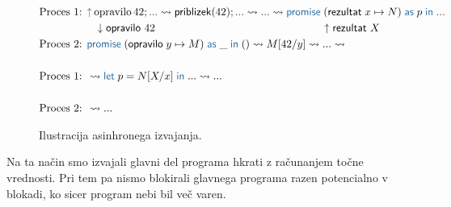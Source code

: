 \begin{figure}[H]
	\centering
	\small
	\begin{align*}
		& \text{Proces 1: }  \tmkw{\uparrow}\, \text{opravilo}\,42;... \reduces \mathsf{priblizek}(42);...  \reduces ... \reduces \tmwith{rezultat}{x}{N}{p}{...}
		\\
		&                \hspace{12ex} \downarrow \mathsf{opravilo}\ 42      \hspace{36ex}              \uparrow \mathsf{rezultat}\ X
		\\
		& \text{Proces 2: } \tmwith{opravilo}{y}{M}{\_}{()} \reduces M[42/y] \reduces ... \reduces
		\\
		\\
		& \text{Proces 1: }  \reduces \tmlet{p}{N[X/x]}{...} \reduces ...
		\\
		&          
		\\
		& \text{Proces 2: } \reduces ...
	\end{align*}
	
	\caption{Ilustracija asinhronega izvajanja.}
	\label{fig:async-illustration}
\end{figure}

Na ta način smo izvajali glavni del programa hkrati z računanjem točne vrednosti. Pri tem pa nismo blokirali glavnega programa razen potencialno v blokadi, ko sicer program nebi bil več varen.
